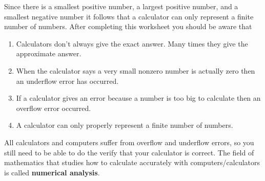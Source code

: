 \documentclass[12pt]{article}%
\begin{document}
Since there is a smallest positive number, a largest positive number, and a smallest negative
number it follows that a calculator can only represent a finite number of numbers.
After completing this worksheet you should be aware that 
\begin{enumerate}
\item Calculators don't always give the exact answer. Many times they give the
approximate answer.
\item When the calculator says a very small nonzero number is actually zero then an
underflow error has occurred.
\item If a calculator gives an error because a number is too big to calculate then an
overflow error occurred.
\item A calculator can only properly represent a finite number of numbers.
\end{enumerate}
All calculators and computers suffer from overflow and 
underflow errors, so you still need to be able to do the 
verify that your calculator is correct. The field of mathematics 
that studies how to calculate accurately with computers/calculators is called \textbf{numerical analysis}.
\end{document}
